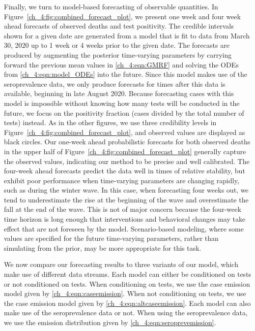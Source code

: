 Finally, we turn to model-based forecasting of observable quantities.
In Figure~\ref{ch_4:fig:combined_forecast_plot}, we present one week and four week ahead forecasts of observed deaths and test positivity.
The credible intervals shown for a given date are generated from a model that is fit to data from March 30, 2020 up to 1 week or 4 weeks prior to the given date.
The forecasts are produced by augmenting the posterior time-varying parameters by carrying forward the previous mean values in \eqref{ch_4:eqn:GMRF} and solving the ODEs from \eqref{ch_4:eqn:model_ODEs} into the future.
Since this model makes use of the seroprevalence data, we only produce forecasts for times after this data is available, beginning in late August 2020.
Because forecasting cases with this model is impossible without knowing how many tests will be conducted in the future, we focus on the positivity fraction (cases divided by the total number of tests) instead.
As in the other figures,  we use three credibility levels in Figure~\ref{ch_4:fig:combined_forecast_plot}, and observed values are displayed as black circles.
Our one-week ahead probabilistic forecasts for both observed deaths in the upper half of Figure~\ref{ch_4:fig:combined_forecast_plot} generally capture the observed values, indicating our method to be precise and well calibrated.
The four-week ahead forecasts predict the data well in times of relative stability, but exhibit poor performance when time-varying parameters are changing rapidly, such as during the winter wave.
In this case, when forecasting four weeks out, we tend to underestimate the rise at the beginning of the wave and overestimate the fall at the end of the wave.
This is not of major concern because the four-week time horizon is long enough that interventions and behavioral changes may take effect that are not foreseen by the model.
Scenario-based modeling, where some values are specified for the future time-varying parameters, rather than simulating from the prior, may be more appropriate for this task.
\par
We now compare our forecasting results to three variants of our model, which make use of different data streams.
Each model can either be conditioned on tests or not conditioned on tests.
When conditioning on tests, we use the case emission model given by \eqref{ch_4:eqn:caseemission}.
When not conditioning on tests, we use the case emission model given by \eqref{ch_4:eqn:altcaseemission}.
Each model can also make use of the seroprevalence data or not.
When using the seroprevalence data, we use the emission distribution given by \eqref{ch_4:eqn:seroprevemission}.
